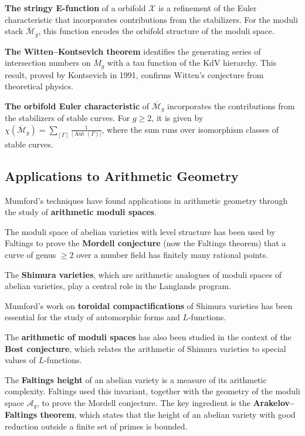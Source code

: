 \textbf{The stringy E-function} of a orbifold $\mathcal{X}$ is a refinement of the Euler characteristic that incorporates contributions from the stabilizers. For the moduli stack $\overline{\mathcal{M}}_g$, this function encodes the orbifold structure of the moduli space.

\textbf{The Witten--Kontsevich theorem} identifies the generating series of intersection numbers on $\overline{M}_g$ with a tau function of the KdV hierarchy. This result, proved by Kontsevich in 1991, confirms Witten's conjecture from theoretical physics.

\textbf{The orbifold Euler characteristic} of $\overline{\mathcal{M}}_g$ incorporates the contributions from the stabilizers of stable curves. For $g \geq 2$, it is given by $\chi(\overline{\mathcal{M}}_g) = \sum_{[\Gamma]} \frac{1}{|\operatorname{Aut}(\Gamma)|}$, where the sum runs over isomorphism classes of stable curves.

\subsection{Applications to Arithmetic Geometry}

Mumford's techniques have found applications in arithmetic geometry through the study of \textbf{arithmetic moduli spaces}.

The moduli space of abelian varieties with level structure has been used by Faltings to prove the \textbf{Mordell conjecture} (now the Faltings theorem) that a curve of genus $\geq 2$ over a number field has finitely many rational points.

The \textbf{Shimura varieties}, which are arithmetic analogues of moduli spaces of abelian varieties, play a central role in the Langlands program.

Mumford's work on \textbf{toroidal compactifications} of Shimura varieties has been essential for the study of automorphic forms and $L$-functions.

The \textbf{arithmetic of moduli spaces} has also been studied in the context of the \textbf{Bost conjecture}, which relates the arithmetic of Shimura varieties to special values of $L$-functions.

The \textbf{Faltings height} of an abelian variety is a measure of its arithmetic complexity. Faltings used this invariant, together with the geometry of the moduli space $\mathcal{A}_g$, to prove the Mordell conjecture. The key ingredient is the \textbf{Arakelov--Faltings theorem}, which states that the height of an abelian variety with good reduction outside a finite set of primes is bounded.

